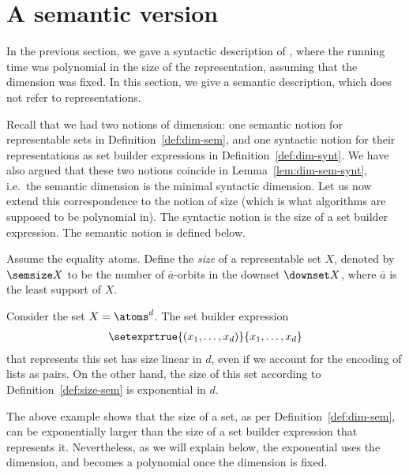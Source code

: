 \section{A semantic version}
\label{sec:semantic-poly}
 
In the previous section, we gave a syntactic description of \fdp, where the running time was polynomial in the size of the representation, assuming that the dimension was fixed. In this section, we give a semantic description, which does not refer to representations. 

Recall that we had two notions of dimension: one semantic notion for representable sets in Definition~\ref{def:dim-sem}, and one syntactic notion  for their representations as set builder expressions in Definition~\ref{def:dim-synt}. We have also argued that these two notions coincide in Lemma~\ref{lem:dim-sem-synt}, i.e.~the semantic dimension is the minimal syntactic dimension. Let us now extend this correspondence to the notion of size (which is what algorithms are supposed to be polynomial in). The syntactic notion is the size of a set builder expression. The semantic notion is defined below.

\begin{definition}\label{def:size-sem} Assume the equality atoms. Define the \emph{size} of a representable set $X$, denoted  by $\semsize X$ to be the number of $\bar a$-orbits in the downset $\downset X$, where $\bar a$ is the least support of $X$. 
\end{definition}



\begin{myexample}\label{ex:sem-size-bell}
 Consider the set $X= \atoms^d$. The set builder expression 
  \begin{align*}
 \setexprtrue {(x_1,\ldots,x_d)} {x_1,\ldots,x_d}
 \end{align*}
that represents this set 
 has size linear in $d$, even if we account for the encoding of lists as pairs. On the other hand, the size of this set according to Definition~\ref{def:size-sem} is exponential in $d$.  
\end{myexample}

The above example shows that the size of a set, as per Definition~\ref{def:dim-sem}, can be exponentially larger than the size of a set builder expression that represents it. Nevertheless, as we will explain below, the exponential uses the dimension, and becomes a polynomial once the dimension is fixed.




